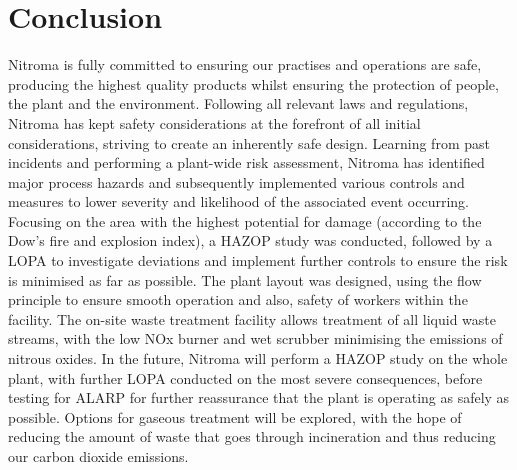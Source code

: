 \section{Conclusion}

Nitroma is fully committed to ensuring our practises and operations are safe, producing the highest quality products whilst ensuring the protection of people, the plant and the environment. Following all relevant laws and regulations, Nitroma has kept safety considerations at the forefront of all initial considerations, striving to create an inherently safe design. Learning from past incidents and performing a plant-wide risk assessment, Nitroma has identified major process hazards and subsequently implemented various controls and measures to lower severity and likelihood of the associated event occurring. Focusing on the area with the highest potential for damage (according to the Dow’s fire and explosion index), a HAZOP study was conducted, followed by a LOPA to investigate deviations and implement further controls to ensure the risk is minimised as far as possible. The plant layout was designed, using the flow principle to ensure smooth operation and also, safety of workers within the facility. The on-site waste treatment facility allows treatment of all liquid waste streams, with the low NOx burner and wet scrubber minimising the emissions of nitrous oxides. In the future, Nitroma will perform a HAZOP study on the whole plant, with further LOPA conducted on the most severe consequences, before testing for ALARP for further reassurance that the plant is operating as safely as possible. Options for gaseous treatment will be explored, with the hope of reducing the amount of waste that goes through incineration and thus reducing our carbon dioxide emissions. 